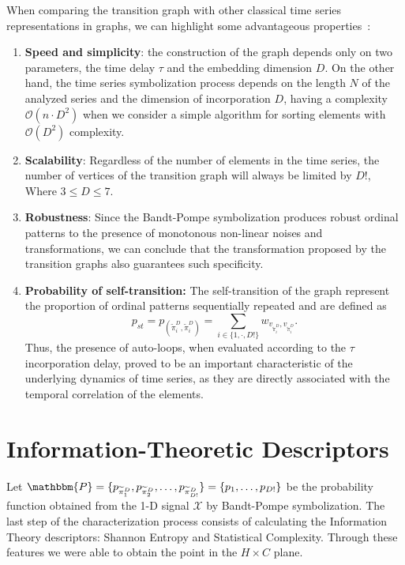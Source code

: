 When comparing the transition graph with other classical time series representations in graphs, we can highlight some advantageous properties~\citep{Borges2019Transition}:
\begin{enumerate}[label=(\roman*)]
    \item \textbf{Speed and simplicity}: the construction of the graph depends only on two parameters, the time delay $\tau$ and the embedding dimension $D$.
    On the other hand, the time series symbolization process depends on the length $N$ of the analyzed series and the dimension of incorporation $D$, having a complexity $\mathcal{O} (n \cdot D^2)$ when we consider a simple algorithm for sorting elements with $\mathcal{O}(D^2)$ complexity.
    \item \textbf{Scalability}: Regardless of the number of elements in the time series, the number of vertices of the transition graph will always be limited by $D!$, Where $3 \leq D \leq 7$.
    \item \textbf{Robustness}: Since the Bandt-Pompe symbolization produces robust ordinal patterns to the presence of monotonous non-linear noises and transformations, we can conclude that the transformation proposed by the transition graphs also guarantees such specificity.
    \item \textbf{Probability of self-transition:} The self-transition of the graph represent the proportion of ordinal patterns sequentially repeated and are defined as
    \begin{equation}
        p_{st} = p_{(\widetilde \pi^D_i, \widetilde \pi^D_i)} = \sum_{i \in \{1, \cdot, D!\}} w_{v_{\widetilde\pi^D_i}, v_{\widetilde\pi^D_i}}.
    \end{equation}
    Thus, the presence of auto-loops, when evaluated according to the $\tau$ incorporation delay, proved to be an important characteristic of the underlying dynamics of time series, as they are directly associated with the temporal correlation of the elements.
\end{enumerate}

\section{Information-Theoretic Descriptors}\label{sub:InformationTheory}

Let $\mathbbm{P} = \{p_{\widetilde\pi^D_1}, p_{\widetilde\pi^D_2}, \dots, p_{\widetilde\pi^D_{D!}} \} = \{p_1,\dots,p_{D!}\}$ be the probability function obtained from the \mbox{1-D} signal $\mathcal{X}$ by Bandt-Pompe symbolization.
The last step of the characterization process consists of calculating the Information Theory descriptors: Shannon Entropy and Statistical Complexity.
Through these features we were able to obtain the point in the $H \times C$ plane.

